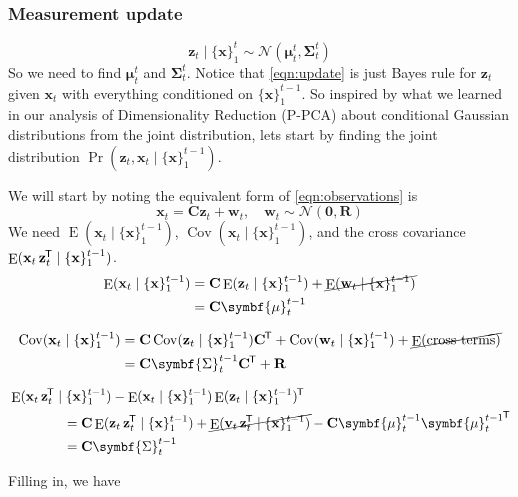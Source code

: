 \documentclass[11pt]{article}
\DeclareMathOperator{\E}{E}
\DeclareMathOperator{\Cov}{Cov}
\newcommand{\xb}{\mathbf{x}}
\newcommand{\zb}{\mathbf{z}}
\newcommand{\ub}{\symbf{\mu}}
\newcommand{\Sb}{\symbf{\Sigma}}
\newcommand{\Cb}{\mathbf{C}}
\newcommand{\Rb}{\mathbf{R}}
\newcommand*{\tran}{^{\mkern-1.5mu\mathsf{T}}}
\begin{document}
\subsubsection*{Measurement update}
\begin{equation*}
  \zb_t \mid \{\xb\}_1^{t} \sim \mathcal{N}(\ub_t^t, \Sb_t^t)
\end{equation*}
So we need to find $\ub_t^t$ and $\Sb_t^t$. Notice that \eqref{eqn:update} is
just Bayes rule for $\zb_t$ given $\xb_t$ with everything conditioned on
$\{\xb\}_1^{t-1}$. So inspired by what we learned in our analysis of Dimensionality
Reduction (P-PCA) about conditional Gaussian distributions from the joint
distribution, lets start by finding the joint distribution
$\Pr(\zb_t,\xb_t \mid \{\xb\}_1^{t-1})$.

We will start by noting the equivalent form of
\eqref{eqn:observations} is
\begin{equation*}
  \xb_t = \Cb \zb_t + \mathbf{w}_t, \quad \mathbf{w}_t \sim
    \mathcal{N}(\mathbf{0}, \Rb)
\end{equation*}
We need $\E(\xb_t\mid\{\xb\}_1^{t-1})$, $\Cov(\xb_t\mid\{\xb\}_1^{t-1})$, and
the cross covariance $\E(\xb_t\,\zb_t\tran \mid\{\xb\}_1^{t-1})$.
\begin{align}
  \E(\xb_t\mid\{\xb\}_1^{t-1}) &= \Cb \E(\zb_t\mid\{\xb\}_1^{t-1}) +
    \cancel{\E(\mathbf{w}_t \mid\{\xb\}_1^{t-1})} \nonumber \\
    &= \Cb \ub_t^{t-1}
\end{align}

\begin{align}
  \Cov(\xb_t\mid\{\xb\}_1^{t-1}) &= \Cb \Cov(\zb_t\mid\{\xb\}_1^{t-1}) \Cb\tran +
    \Cov(\mathbf{w}_t \mid\{\xb\}_1^{t-1}) + \cancel{\E(\text{cross terms})}\nonumber \\
    &= \Cb \Sb_t^{t-1} \Cb\tran + \Rb
\end{align}

\begin{align}
  &\E(\xb_t \, \zb_t\tran \mid\{\xb\}_1^{t-1}) - \E(\xb_t\mid\{\xb\}_1^{t-1})
      \E(\zb_t\mid\{\xb\}_1^{t-1})\tran \\
   &\qquad\qquad = \Cb \E(\zb_t \,\zb_t\tran \mid\{\xb\}_1^{t-1}) +
       \cancel{\E(\mathbf{v}_t \, \zb_t\tran \mid\{\xb\}_1^{t-1})} -
       \Cb \ub_t^{t-1} {\ub_t^{t-1}}\tran \\
  &\qquad\qquad = \Cb \Sb_t^{t-1}
\end{align}

Filling in, we have
\end{document}
